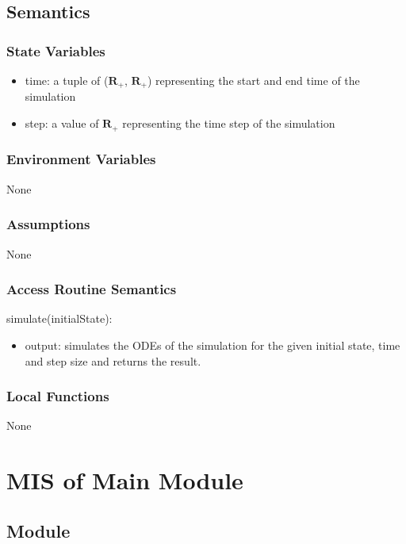 \documentclass[12pt, titlepage]{article}
\begin{document}
\subsection{Semantics}

\subsubsection{State Variables}

\begin{itemize}
  \item time: a tuple of ($\mathbf{R}_{+}$, $\mathbf{R}_{+}$) representing the start and end time of the simulation
  \item step: a value of $\mathbf{R}_{+}$ representing the time step of the simulation
\end{itemize}

\subsubsection{Environment Variables}

None

\subsubsection{Assumptions}

None

\subsubsection{Access Routine Semantics}

\noindent simulate(initialState):
\begin{itemize}
\item output: simulates the ODEs of the simulation for the given initial state, time and step size and returns the result.
\end{itemize}

\subsubsection{Local Functions}

None

\newpage

\section{MIS of Main Module} \label{Module_main}
\subsection{Module}
\end{document}
